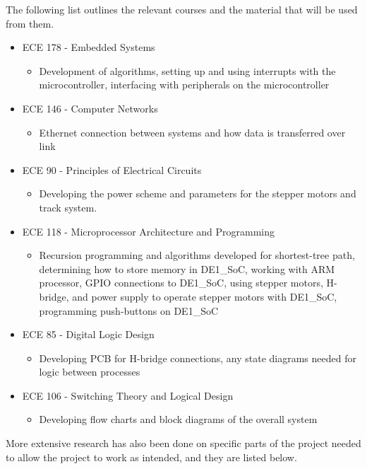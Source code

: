 The following list outlines the relevant courses and the material that will be used from them. \\
\begin{itemize}
	\item ECE 178 - Embedded Systems
	\begin{itemize}
		\item Development of algorithms, setting up and using interrupts with the microcontroller, interfacing with peripherals on the microcontroller
	\end{itemize}
	\item ECE 146 - Computer Networks
	\begin{itemize}
		\item Ethernet connection between systems and how data is transferred over link
	\end{itemize}
	\item ECE 90 - Principles of Electrical Circuits
	\begin{itemize}
		\item Developing the power scheme and parameters for the stepper motors and track system.
		\end{itemize}
	\item ECE 118 - Microprocessor Architecture and Programming
	\begin{itemize}
		\item Recursion programming and algorithms developed for shortest-tree path, determining how to store memory in DE1\_SoC, working with ARM processor, GPIO connections to DE1\_SoC, using stepper motors, H-bridge, and power supply to operate stepper motors with DE1\_SoC, programming push-buttons on DE1\_SoC
	\end{itemize}
	\item ECE 85 - Digital Logic Design
	\begin{itemize}
		\item Developing PCB for H-bridge connections, any state diagrams needed for logic between processes
	\end{itemize}
	\item ECE 106 - Switching Theory and Logical Design
	\begin{itemize}
		\item Developing flow charts and block diagrams of the overall system \\
	\end{itemize}
\end{itemize}

More extensive research has also been done on specific parts of the project needed to allow the project to work as intended, and they are listed below.


